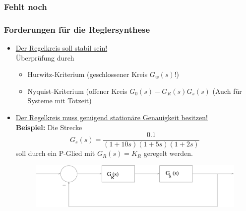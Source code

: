 \documentclass[12pt,a4paper,ngerman]{scrartcl}
\newcommand{\RM}[1]{\MakeUppercase{\romannumeral #1{.}}}
\begin{document}
\subsubsection{Fehlt noch}
\subsubsection{Forderungen für die Reglersynthese}
\begin{itemize}
\item[\RM{1}] \underline{Der Regelkreis soll stabil sein!}\\
Überprüfung durch
\begin{itemize}
\item Hurwitz-Kriterium (geschlossener Kreis $G_w(s)$!)
\item Nyquist-Kriterium (offener Kreis $G_0(s)-G_R(s)G_s(s)$ (Auch für Systeme mit Totzeit)
\end{itemize}
\item[\RM{2}] \underline{Der Regelkreis muss genügend stationäre Genauigkeit besitzen!}\\
\textbf{Beispiel:} Die Strecke
\[
G_s(s)=\frac{0.1}{(1+10s)(1+5s)(1+2s)}
\]
soll durch ein P-Glied mit $G_R(s)=K_R$ geregelt werden.
\begin{figure}[H]
  \centering
  \includegraphics[width=.7\linewidth]{sysregel_No_1}
\end{figure}


\end{itemize}
\end{document}
